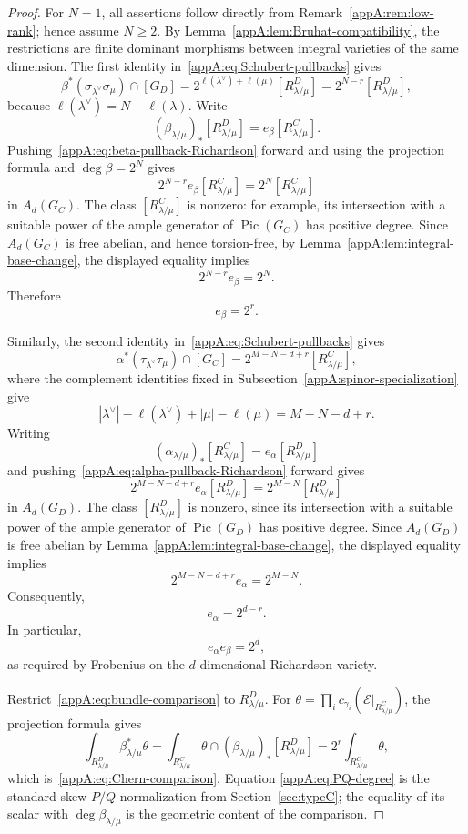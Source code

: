 \documentclass[11pt,a4paper,oneside]{amsart}
\numberwithin{equation}{section}
\theoremstyle{definition}
\theoremstyle{remark}
\begin{document}
\begin{proof}
For $N=1$, all assertions follow directly from
Remark~\ref{appA:rem:low-rank}; hence assume $N\geq2$.  By
Lemma~\ref{appA:lem:Bruhat-compatibility}, the restrictions are finite
dominant morphisms between integral varieties of the same dimension.  The
first identity in~\eqref{appA:eq:Schubert-pullbacks} gives
\begin{equation}
\label{appA:eq:beta-pullback-Richardson}
  \beta^*(\sigma_{\lambda^\vee}\sigma_\mu)\cap[G_D]
  =2^{\ell(\lambda^\vee)+\ell(\mu)}[R^D_{\lambda/\mu}]
  =2^{N-r}[R^D_{\lambda/\mu}],
\end{equation}
because $\ell(\lambda^\vee)=N-\ell(\lambda)$.  Write
\[
  (\beta_{\lambda/\mu})_*[R^D_{\lambda/\mu}]
  =e_\beta[R^C_{\lambda/\mu}].
\]
Pushing~\eqref{appA:eq:beta-pullback-Richardson} forward and using the
projection formula and $\deg\beta=2^N$ gives
\[
  2^{N-r}e_\beta[R^C_{\lambda/\mu}]
  =2^N[R^C_{\lambda/\mu}]
\]
in $A_d(G_C)$.  The class $[R^C_{\lambda/\mu}]$ is nonzero: for example,
its intersection with a suitable power of the ample generator of
$\operatorname{Pic}(G_C)$ has positive degree.  Since $A_d(G_C)$ is free
abelian, and hence torsion-free, by
Lemma~\ref{appA:lem:integral-base-change}, the displayed equality implies
\[
  2^{N-r}e_\beta=2^N.
\]
Therefore
\[
  e_\beta=2^r.
\]

Similarly, the second identity in~\eqref{appA:eq:Schubert-pullbacks} gives
\begin{equation}
\label{appA:eq:alpha-pullback-Richardson}
  \alpha^*(\tau_{\lambda^\vee}\tau_\mu)\cap[G_C]
  =2^{M-N-d+r}[R^C_{\lambda/\mu}],
\end{equation}
where the complement identities fixed in
Subsection~\ref{appA:spinor-specialization} give
\[
  |\lambda^\vee|-\ell(\lambda^\vee)
  +|\mu|-\ell(\mu)=M-N-d+r.
\]
Writing
\[
  (\alpha_{\lambda/\mu})_*[R^C_{\lambda/\mu}]
  =e_\alpha[R^D_{\lambda/\mu}]
\]
and pushing~\eqref{appA:eq:alpha-pullback-Richardson} forward gives
\[
  2^{M-N-d+r}e_\alpha[R^D_{\lambda/\mu}]
  =2^{M-N}[R^D_{\lambda/\mu}]
\]
in $A_d(G_D)$.  The class $[R^D_{\lambda/\mu}]$ is nonzero, since its
intersection with a suitable power of the ample generator of
$\operatorname{Pic}(G_D)$ has positive degree.  Since $A_d(G_D)$ is free
abelian by Lemma~\ref{appA:lem:integral-base-change}, the displayed equality
implies
\[
  2^{M-N-d+r}e_\alpha=2^{M-N}.
\]
Consequently,
\[
  e_\alpha=2^{d-r}.
\]
In particular,
\[
  e_\alpha e_\beta=2^d,
\]
as required by Frobenius on the $d$-dimensional Richardson variety.

Restrict~\eqref{appA:eq:bundle-comparison} to $R^D_{\lambda/\mu}$.  For
$\theta=\prod_i c_{\gamma_i}(\mathcal E|_{R^C_{\lambda/\mu}})$, the
projection formula gives
\[
  \int_{R^D_{\lambda/\mu}}\beta_{\lambda/\mu}^*\theta
  =\int_{R^C_{\lambda/\mu}}
    \theta\cap(\beta_{\lambda/\mu})_*[R^D_{\lambda/\mu}]
  =2^r\int_{R^C_{\lambda/\mu}}\theta,
\]
which is~\eqref{appA:eq:Chern-comparison}.  Equation
\eqref{appA:eq:PQ-degree} is the standard skew $P/Q$ normalization from
Section~\ref{sec:typeC}; the equality of its scalar with
$\deg\beta_{\lambda/\mu}$ is the geometric content of the comparison.
\end{proof}
\end{document}
